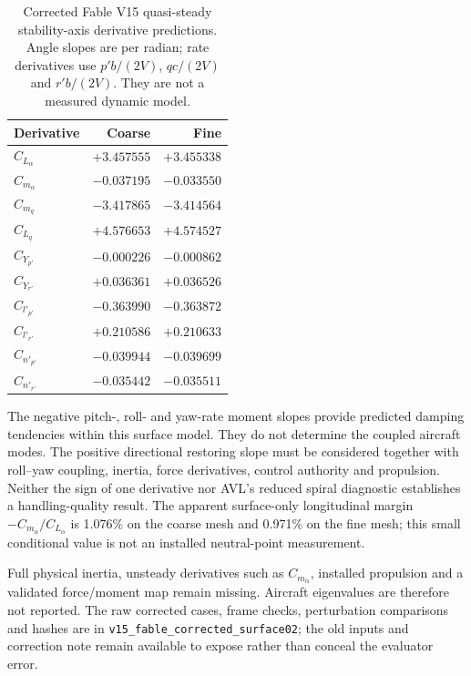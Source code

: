 \begin{table}[p]\centering\small
\caption{Corrected Fable V15 quasi-steady stability-axis derivative predictions. Angle slopes are per radian; rate derivatives use $p'b/(2V)$, $qc/(2V)$ and $r'b/(2V)$. They are not a measured dynamic model.}
\label{tab:fable-corrected-rates}
\begin{tabular}{lrr}\toprule
Derivative & Coarse & Fine\\\midrule
$C_{L_\alpha}$ & $+3.457555$ & $+3.455338$\\
$C_{m_\alpha}$ & $-0.037195$ & $-0.033550$\\
$C_{m_q}$ & $-3.417865$ & $-3.414564$\\
$C_{L_q}$ & $+4.576653$ & $+4.574527$\\
$C_{Y_{p\prime}}$ & $-0.000226$ & $-0.000862$\\
$C_{Y_{r\prime}}$ & $+0.036361$ & $+0.036526$\\
$C_{l\prime_{p\prime}}$ & $-0.363990$ & $-0.363872$\\
$C_{l\prime_{r\prime}}$ & $+0.210586$ & $+0.210633$\\
$C_{n\prime_{p\prime}}$ & $-0.039944$ & $-0.039699$\\
$C_{n\prime_{r\prime}}$ & $-0.035442$ & $-0.035511$\\
\bottomrule\end{tabular}\end{table}

The negative pitch-, roll- and yaw-rate moment slopes provide predicted
damping tendencies within this surface model. They do not determine the
coupled aircraft modes. The positive directional restoring slope must be
considered together with roll--yaw coupling, inertia, force derivatives,
control authority and propulsion. Neither the sign of one derivative nor
AVL's reduced spiral diagnostic establishes a handling-quality result.
The apparent surface-only longitudinal margin $-C_{m_\alpha}/C_{L_\alpha}$ is 1.076\% on the coarse mesh and 0.971\% on the fine mesh; this small conditional value is not an installed neutral-point measurement.

Full physical inertia, unsteady derivatives such as
$C_{m_{\dot\alpha}}$, installed propulsion and a validated force/moment map
remain missing. Aircraft eigenvalues are therefore not reported. The raw
corrected cases, frame checks, perturbation comparisons and hashes are in
\texttt{v15\_fable\_corrected\_surface02}; the old inputs and correction note
remain available to expose rather than conceal the evaluator error.
